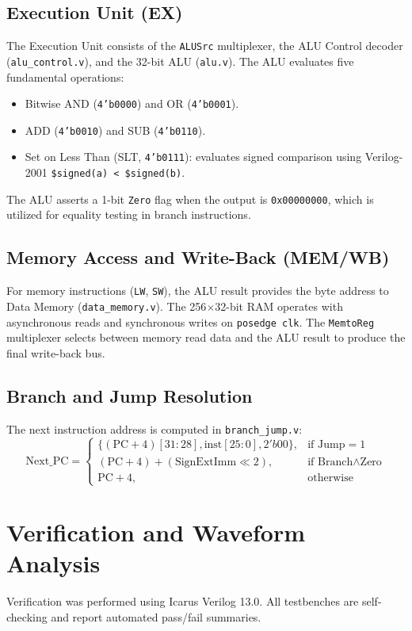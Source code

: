 \documentclass[conference]{IEEEtran}
\begin{document}
\subsection{Execution Unit (EX)}
The Execution Unit consists of the \texttt{ALUSrc} multiplexer, the ALU Control decoder (\texttt{alu_control.v}), and the 32-bit ALU (\texttt{alu.v}). The ALU evaluates five fundamental operations:
\begin{itemize}
    \item Bitwise AND (\texttt{4'b0000}) and OR (\texttt{4'b0001}).
    \item ADD (\texttt{4'b0010}) and SUB (\texttt{4'b0110}).
    \item Set on Less Than (SLT, \texttt{4'b0111}): evaluates signed comparison using Verilog-2001 \texttt{\$signed(a) < \$signed(b)}.
\end{itemize}
The ALU asserts a 1-bit \texttt{Zero} flag when the output is \texttt{0x00000000}, which is utilized for equality testing in branch instructions.

\subsection{Memory Access and Write-Back (MEM/WB)}
For memory instructions (\texttt{LW}, \texttt{SW}), the ALU result provides the byte address to Data Memory (\texttt{data_memory.v}). The 256$\times$32-bit RAM operates with asynchronous reads and synchronous writes on \texttt{posedge clk}. The \texttt{MemtoReg} multiplexer selects between memory read data and the ALU result to produce the final write-back bus.

\subsection{Branch and Jump Resolution}
The next instruction address is computed in \texttt{branch_jump.v}:
\begin{equation}
\text{Next\_PC} = 
\begin{cases}
\{(\text{PC}+4)[31:28], \text{inst}[25:0], 2'b00\}, & \text{if } \text{Jump} = 1 \\
(\text{PC}+4) + (\text{SignExtImm} \ll 2), & \text{if } \text{Branch} \land \text{Zero} \\
\text{PC}+4, & \text{otherwise}
\end{cases}
\end{equation}

\section{Verification and Waveform Analysis}
Verification was performed using Icarus Verilog 13.0. All testbenches are self-checking and report automated pass/fail summaries.
\end{document}
